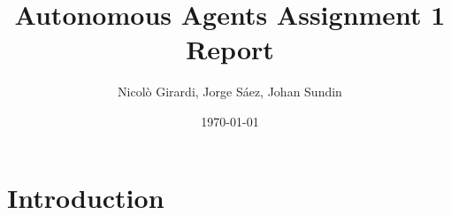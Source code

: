 \documentclass{article}
\title{Autonomous Agents Assignment 1 \\ Report}
\author{Nicolò Girardi, Jorge Sáez, Johan Sundin}
\date{\today}
\begin{document}
\maketitle

\section{Introduction}
\end{document}
